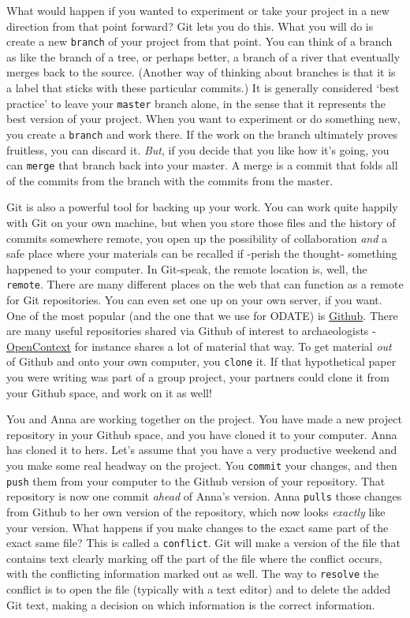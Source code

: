 \documentclass[english,]{book}
\begin{document}
What would happen if you wanted to experiment or take your project in a
new direction from that point forward? Git lets you do this. What you
will do is create a new \texttt{branch} of your project from that point.
You can think of a branch as like the branch of a tree, or perhaps
better, a branch of a river that eventually merges back to the source.
(Another way of thinking about branches is that it is a label that
sticks with these particular commits.) It is generally considered `best
practice' to leave your \texttt{master} branch alone, in the sense that
it represents the best version of your project. When you want to
experiment or do something new, you create a \texttt{branch} and work
there. If the work on the branch ultimately proves fruitless, you can
discard it. \emph{But}, if you decide that you like how it's going, you
can \texttt{merge} that branch back into your master. A merge is a
commit that folds all of the commits from the branch with the commits
from the master.

Git is also a powerful tool for backing up your work. You can work quite
happily with Git on your own machine, but when you store those files and
the history of commits somewhere remote, you open up the possibility of
collaboration \emph{and} a safe place where your materials can be
recalled if -perish the thought- something happened to your computer. In
Git-speak, the remote location is, well, the \texttt{remote}. There are
many different places on the web that can function as a remote for Git
repositories. You can even set one up on your own server, if you want.
One of the most popular (and the one that we use for ODATE) is
\href{http://github.com}{Github}. There are many useful repositories
shared via Github of interest to archaeologists -
\href{http://opencontext.org}{OpenContext} for instance shares a lot of
material that way. To get material \emph{out} of Github and onto your
own computer, you \texttt{clone} it. If that hypothetical paper you were
writing was part of a group project, your partners could clone it from
your Github space, and work on it as well!

You and Anna are working together on the project. You have made a new
project repository in your Github space, and you have cloned it to your
computer. Anna has cloned it to hers. Let's assume that you have a very
productive weekend and you make some real headway on the project. You
\texttt{commit} your changes, and then \texttt{push} them from your
computer to the Github version of your repository. That repository is
now one commit \emph{ahead} of Anna's version. Anna \texttt{pulls} those
changes from Github to her own version of the repository, which now
looks \emph{exactly} like your version. What happens if you make changes
to the exact same part of the exact same file? This is called a
\texttt{conflict}. Git will make a version of the file that contains
text clearly marking off the part of the file where the conflict occurs,
with the conflicting information marked out as well. The way to
\texttt{resolve} the conflict is to open the file (typically with a text
editor) and to delete the added Git text, making a decision on which
information is the correct information.
\end{document}
